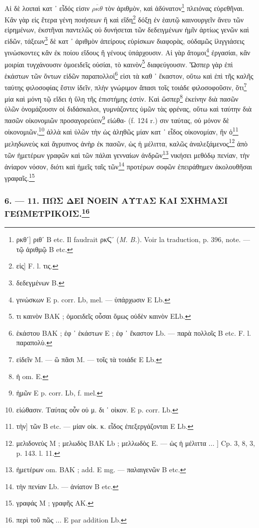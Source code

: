 \documentclass[a4paper, 11pt, oneside, polutonikogreek, french]{article}
\begin{document}
Αἱ δὲ λοιπαὶ κατ ᾽ εἶδός εἰσιν $\overline{ρκθ}$ τὸν ἀριθμὸν, καὶ ἀδύνατον\footnote{ρκθʹ] ριθʹ B etc. Il faudrait ρκϚʹ (\emph{M. B.}). Voir la traduction, p. 396, note. --- τῷ ἀριθμῷ B etc.} πλειόνας εὑρεθῆναι. Κἂν γὰρ εἰς ἕτερα γένη ποιήσεων ἢ καὶ εἴδη\footnote{εἰς] F. l. τις.} δόξῃ ἐν ἑαυτῷ καινουργεῖν ἄνευ τῶν εἰρημένων, ἐκστῆναι παντελῶς οὐ δυνήσεται τῶν δεδειγμένων ἡμῖν ἀρτίως γενῶν καὶ εἰδῶν, τάξεων\footnote{δεδεγμένων B.} δὲ κατ ᾽ ἀριθμὸν ἀπείρους εὑρίσκων διαφορὰς, οὐδαμῶς ἰλιγγιάσεις γινώσκοντες κἂν ἐκ ποίου εἴδους ἢ γένους ὑπάρχουσιν. Αἱ γὰρ ἄτομοι\footnote{γινώσκων E p. corr. Lb, mel. --- ὑπάρχωσιν E Lb.} ἐργασίαι, κἂν μοιρίαι τυγχάνουσιν ὁμοειδεῖς οὐσίαι, τὸ καινὸν\footnote{τι καινὸν BAK ; ὁμοειδεῖς οὖσαι ὅμως οὐδὲν καινὸν ELb.} διαφεύγουσιν. Ὥσπερ γὰρ ἐπὶ ἑκάστων τῶν ὄντων εἰδῶν παραπολλοὶ\footnote{ἑκάστου BAK ; ἐφ ᾽ ἑκάστων E ; ἐφ ᾽ ἕκαστον Lb. --- παρὰ πολλοῖς B etc. F. l. παραπολὺ.} εἰσι τὰ καθ ᾽ ἕκαστον, οὕτω καὶ ἐπὶ τῆς καλῆς ταύτης φιλοσοφίας ἔστιν ἰδεῖν, πλὴν γνώριμον ἅπασι τοῖς τοιάδε φιλοσοφοῦσιν, ὅτι\footnote{εἰδεῖν M. --- ὣ πᾶσι M. --- τοῖς τὰ τοιάδε E Lb.} μία καὶ μόνη τῷ εἴδει ἡ ὕλη τῆς ἐπιστήμης ἐστίν. Καὶ ὥσπερ\footnote{ἡ om. E.} ἐκείνην διὰ πασῶν ὑλῶν ὁνομάζουσιν οἱ διδάσκαλοι, γυμνάζοντες ὑμῶν τὰς φρένας, οὕτω καὶ ταύτην διὰ πασῶν οἰκονομιῶν προσαγορεύειν\footnote{ἡμῶν E p. corr. Lb, f. mel.} εἰώθα- (f. 124 r.) σιν ταύτας, οὐ μόνον δὲ οἰκονομιῶν,\footnote{εἰώθασιν. Ταύτας οὖν οὐ μ. δι ᾽ οἰκον. E p. corr. Lb.} ἀλλὰ καὶ ὑλῶν τὴν ὡς ἀληθῶς μίαν κατ ᾽ εἶδος οἰκονομίαν, ἣν ὁ\footnote{τὴν] τῶν B etc. --- μίαν οἰκ. κ. εἶδος ἐπεξεργάζονται E Lb.} μεληδωνεὺς καὶ ἄγρυπνος ἀνὴρ ἐκ πασῶν, ὡς ἡ μέλιττα, καλῶς ἀναλεξάμενος\footnote{μελιδονεὺς M ; μελωδὸς BAK Lb ; μελλωδὸς E. --- ὡς ἡ μέλιττα ... ] Cp. 3, 8, 3, p. 143. l. 11.} ἀπὸ τῶν ἡμετέρων γραφῶν καὶ τῶν πάλαι γενναίων ἀνδρῶν\footnote{ἡμετέρων om. BAK ; add. E mg. --- παλαιγενῶν B etc.} νικήσει μεθόδῳ πενίαν, τὴν ἀνίαρον νόσον, διότι καὶ ἡμεῖς ταῖς τῶν\footnote{τὴν πενίαν Lb. --- ἀνίατον B etc.} προτέρων σοφῶν ἐπειράθημεν ἀκολουθῆσαι γραφαῖς.\footnote{γραφάς M ; γραφῆς AK.}

\bigskip
\centerline{\EightStarTaper}
\centerline{\EightStarTaper\EightStarTaper}
\bigskip

\subsubsection[6. --- 11. ΠΩΣ ΔΕΙ ΝΟΕΙΝ ΑΥΤΑΣ ΚΑΙ ΣΧΗΜΑΣΙ ΓΕΩΜΕΤΡΙΚΟΙΣ.]{6. --- 11. ΠΩΣ ΔΕΙ ΝΟΕΙΝ ΑΥΤΑΣ ΚΑΙ ΣΧΗΜΑΣΙ ΓΕΩΜΕΤΡΙΚΟΙΣ.\footnote{περὶ τοῦ πῶς ... E par addition Lb.}}
\end{document}
